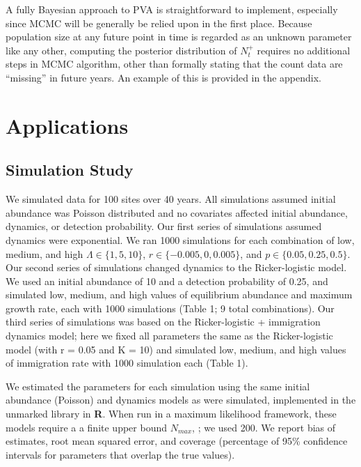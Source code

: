 \documentclass[12pt]{article}
\begin{document}
A fully Bayesian approach to PVA is straightforward to
implement, especially since MCMC will be generally be relied upon in the
first place. Because population size at any future point %
in time is regarded as an unknown parameter like any other, computing the
posterior distribution of $N^+_t$ requires no additional steps
in MCMC algorithm, other than formally stating that the count data are
``missing'' in future years. An example of this is provided in the appendix.



\section{Applications}
\label{sec:app}

\subsection{Simulation Study}


We simulated data for 100 sites over 40 years.  All
simulations assumed initial abundance was Poisson distributed
and no covariates affected initial abundance, dynamics, or
detection probability.  Our first series of simulations
assumed dynamics were exponential.  We ran 1000 simulations for
each combination of low, medium, and high $\Lambda \in
\{1,5,10\}$, $r \in \{-0.005, 0, 0.005\}$, and
$p \in \{0.05, 0.25, 0.5\}$. %
Our second series of simulations changed dynamics to the Ricker-logistic
model. We used an initial abundance of 10 and a detection probability
of 0.25, and simulated low, medium, and high values of equilibrium
abundance and maximum growth rate, each with 1000 simulations (Table 1;
9 total combinations). Our third series of simulations was based
on the Ricker-logistic + immigration dynamics model; here we fixed all
parameters the same as the Ricker-logistic model (with r = 0.05 and K = 10) and
simulated low, medium, and high values of immigration rate with 1000
simulation each (Table 1).

We estimated the parameters for each simulation using the same
initial abundance (Poisson) and dynamics models as were
simulated, implemented in the unmarked library in \textbf{R}.
When run in a maximum likelihood framework, these models require a
a finite upper bound $N_{max}$,
\citep{royle:2004biom,dail_madsen:2011};
we used 200.  We report bias of estimates, root
mean squared error, and coverage (percentage of 95\% confidence
intervals for parameters that overlap the true values).
\end{document}
